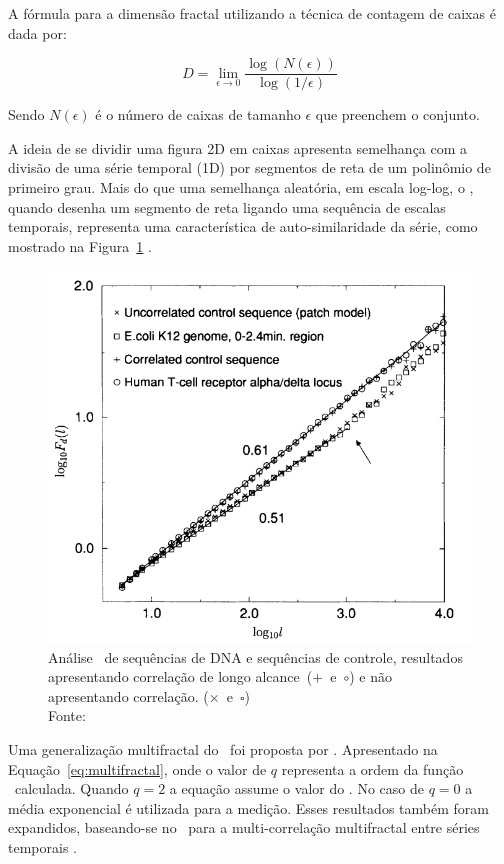 A fórmula para a dimensão fractal utilizando a técnica de contagem de caixas é dada por:

\begin{equation}\label{eq:Hausdorff}
  D = \lim_{\epsilon \to 0} \frac{\log(N(\epsilon))}{\log(1/\epsilon)}
\end{equation}


Sendo $N(\epsilon)$ é o número de caixas de tamanho $\epsilon$ que preenchem o conjunto.


A ideia de se dividir uma figura 2D em caixas apresenta semelhança com a divisão de uma série temporal (1D) por segmentos de reta de um polinômio de primeiro grau. Mais do que uma semelhança aleatória, em escala log-log, o \dfa, quando desenha um segmento de reta ligando uma sequência de escalas temporais, representa uma característica de auto-similaridade da série, como mostrado na Figura~\ref{fig:peng01} \cite{Peng1994}.

\begin{figure}[!htb]
	\centering
	\includegraphics[width=.8\textwidth]{../Figures/peng.png}
  \captionsetup{justification=centering}
  \caption{Análise \dfa~de sequências de DNA e sequências de controle, resultados apresentando correlação de longo alcance~($+$~e~$\circ$) e não apresentando correlação. ($\times$~e~$\square$)\\Fonte: \cite{Peng1994}}
\label{fig:peng01}
\end{figure}

Uma generalização multifractal do \dfa~foi proposta por . Apresentado na Equação~\ref{eq:multifractal}, onde o valor de $q$ representa a ordem da função \dfa~calculada. Quando $q=2$ a equação assume o valor do \dfa. No caso de $q=0$ a média exponencial é utilizada para a medição. Esses resultados também foram expandidos, baseando-se no \dcca~para a multi-correlação multifractal entre séries temporais \cite{zhouMultifractalDetrendedCrosscorrelation2008}.


